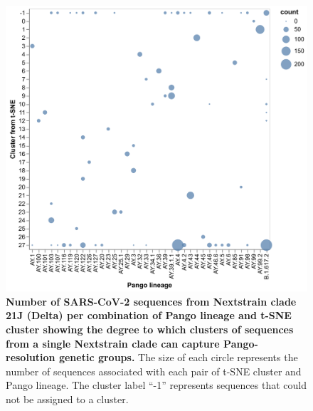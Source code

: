 \begin{figure}[!h]
\includegraphics[width=\columnwidth]{figures/sarscov2-single-clade-lineages-and-clusters-counts.png}
\caption{{\bf Number of SARS-CoV-2 sequences from Nextstrain clade 21J (Delta) per combination of Pango lineage and t-SNE cluster showing the degree to which clusters of sequences from a single Nextstrain clade can capture Pango-resolution genetic groups.}
  The size of each circle represents the number of sequences associated with each pair of t-SNE cluster and Pango lineage.
  The cluster label ``-1'' represents sequences that could not be assigned to a cluster.}\label{S_Fig_sarscov2_single_clade_embeddings_tsne_counts}
\end{figure}

